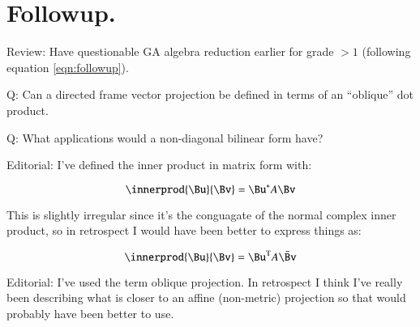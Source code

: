 \documentclass{article}      %
\newcommand{\T}[0]{\text{T}}
\begin{document}
\section{ Followup. } 

Review: Have questionable GA algebra reduction earlier for grade $>1$ (following equation \ref{eqn:followup}).

Q: Can a directed frame vector projection be defined in terms of an ``oblique'' dot product.

Q: What applications would a non-diagonal bilinear form have?

Editorial: I've defined the inner product in matrix form with:

\[
\innerprod{\Bu}{\Bv} = \Bu^* A \Bv
\]

This is slightly irregular since it's the conguagate of the normal complex
inner product, so in retrospect I would have been better to express things as:

\[
\innerprod{\Bu}{\Bv} = \Bu^\T A \bar{\Bv}
\]

Editorial: I've used the term oblique projection.  In retrospect I think I've really been describing what is closer to an affine (non-metric) projection so that would probably have been better to use.

\end{document}
